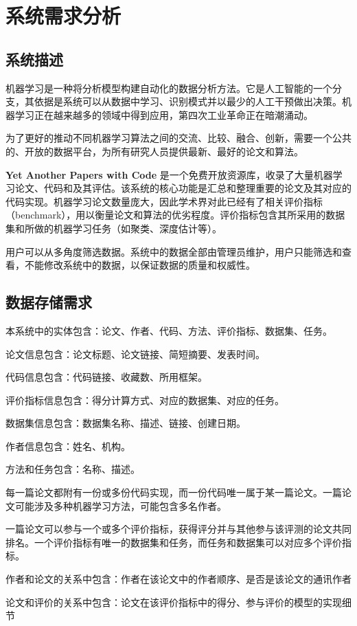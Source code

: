 \chapter{系统需求分析}
\section{系统描述}
机器学习是一种将分析模型构建自动化的数据分析方法。它是人工智能的一个分支，其依据是系统可以从数据中学习、识别模式并以最少的人工干预做出决策。机器学习正在越来越多的领域中得到应用，第四次工业革命正在暗潮涌动。

为了更好的推动不同机器学习算法之间的交流、比较、融合、创新，需要一个公共的、开放的数据平台，为所有研究人员提供最新、最好的论文和算法。

\textbf{Yet Another Papers with Code} 是一个免费开放资源库，收录了大量机器学习论文、代码和及其评估。该系统的核心功能是汇总和整理重要的论文及其对应的代码实现。机器学习论文数量庞大，因此学术界对此已经有了相关评价指标（benchmark），用以衡量论文和算法的优劣程度。评价指标包含其所采用的数据集和所做的机器学习任务（如聚类、深度估计等）。

用户可以从多角度筛选数据。系统中的数据全部由管理员维护，用户只能筛选和查看，不能修改系统中的数据，以保证数据的质量和权威性。


\section{数据存储需求}
本系统中的实体包含：论文、作者、代码、方法、评价指标、数据集、任务。

论文信息包含：论文标题、论文链接、简短摘要、发表时间。

代码信息包含：代码链接、收藏数、所用框架。

评价指标信息包含：得分计算方式、对应的数据集、对应的任务。

数据集信息包含：数据集名称、描述、链接、创建日期。

作者信息包含：姓名、机构。

方法和任务包含：名称、描述。

每一篇论文都附有一份或多份代码实现，而一份代码唯一属于某一篇论文。一篇论文可能涉及多种机器学习方法，可能包含多名作者。

一篇论文可以参与一个或多个评价指标，获得评分并与其他参与该评测的论文共同排名。一个评价指标有唯一的数据集和任务，而任务和数据集可以对应多个评价指标。

作者和论文的关系中包含：作者在该论文中的作者顺序、是否是该论文的通讯作者

论文和评价的关系中包含：论文在该评价指标中的得分、参与评价的模型的实现细节

